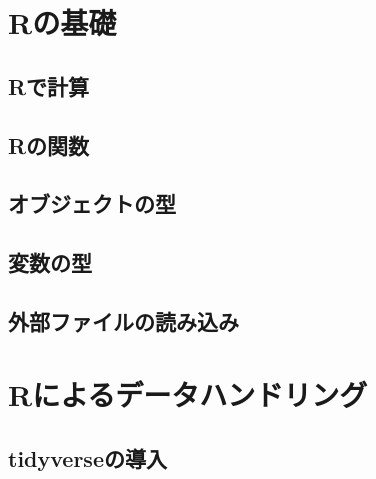 \documentclass[
  a4paper,
]{ltjsbook}
\begin{document}
\hypertarget{rux306eux57faux790e-1}{%
\chapter{Rの基礎}\label{rux306eux57faux790e-1}}

\hypertarget{rux3067ux8a08ux7b97-1}{%
\section{Rで計算}\label{rux3067ux8a08ux7b97-1}}

\hypertarget{rux306eux95a2ux6570-1}{%
\section{Rの関数}\label{rux306eux95a2ux6570-1}}

\hypertarget{ux30aaux30d6ux30b8ux30a7ux30afux30c8ux306eux578b-1}{%
\section{オブジェクトの型}\label{ux30aaux30d6ux30b8ux30a7ux30afux30c8ux306eux578b-1}}

\hypertarget{ux5909ux6570ux306eux578b-1}{%
\section{変数の型}\label{ux5909ux6570ux306eux578b-1}}

\hypertarget{ux5916ux90e8ux30d5ux30a1ux30a4ux30ebux306eux8aadux307fux8fbcux307f-5}{%
\section{外部ファイルの読み込み}\label{ux5916ux90e8ux30d5ux30a1ux30a4ux30ebux306eux8aadux307fux8fbcux307f-5}}

\hypertarget{rux306bux3088ux308bux30c7ux30fcux30bfux30cfux30f3ux30c9ux30eaux30f3ux30b0-5}{%
\chapter{Rによるデータハンドリング}\label{rux306bux3088ux308bux30c7ux30fcux30bfux30cfux30f3ux30c9ux30eaux30f3ux30b0-5}}

\hypertarget{tidyverseux306eux5c0eux5165-5}{%
\section{tidyverseの導入}\label{tidyverseux306eux5c0eux5165-5}}
\end{document}
